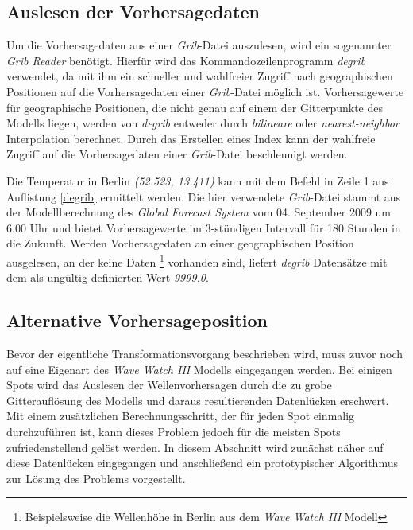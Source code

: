 \subsection{Auslesen der Vorhersagedaten}
\label{auslesen-der-vorhersagedaten}
Um die Vorhersagedaten aus einer \textit{Grib}-Datei auszulesen, wird
ein sogenannter \textit{Grib Reader} benötigt. Hierfür wird das
Kommandozeilenprogramm \textit{degrib} verwendet, da mit ihm ein
schneller und wahlfreier Zugriff nach geographischen Positionen auf
die Vorhersagedaten einer \textit{Grib}-Datei möglich
ist. Vorhersagewerte für geographische Positionen, die nicht genau auf
einem der Gitterpunkte des Modells liegen, werden von \textit{degrib}
entweder durch \textit{bilineare} oder \textit{nearest-neighbor}
Interpolation berechnet. Durch das Erstellen eines Index kann der
wahlfreie Zugriff auf die Vorhersagedaten einer \textit{Grib}-Datei
beschleunigt werden.



Die Temperatur in Berlin \textit{(52.523, 13.411)} kann mit dem Befehl
in Zeile 1 aus Auflistung \ref{degrib} ermittelt werden. Die hier
verwendete \textit{Grib}-Datei stammt aus der Modellberechnung des
\textit{Global Forecast System} vom 04. September 2009 um 6.00 Uhr und
bietet Vorhersagewerte im 3-stündigen Intervall für 180 Stunden in die
Zukunft. Werden Vorhersagedaten an einer geographischen Position
ausgelesen, an der keine Daten \footnote{Beispielsweise die Wellenhöhe
  in Berlin aus dem \textit{Wave Watch III} Modell} vorhanden sind,
liefert \textit{degrib} Datensätze mit dem als ungültig definierten
Wert \textit{9999.0}.

\subsection{Alternative Vorhersageposition}
Bevor der eigentliche Transformationsvorgang beschrieben wird, muss
zuvor noch auf eine Eigenart des \textit{Wave Watch III} Modells
eingegangen werden. Bei einigen Spots wird das Auslesen der
Wellenvorhersagen durch die zu grobe Gitterauflösung des Modells und
daraus resultierenden Datenlücken erschwert. Mit einem zusätzlichen
Berechnungsschritt, der für jeden Spot einmalig durchzuführen ist,
kann dieses Problem jedoch für die meisten Spots zufriedenstellend
gelöst werden. In diesem Abschnitt wird zunächst näher auf diese
Datenlücken eingegangen und anschließend ein prototypischer
Algorithmus zur Lösung des Problems vorgestellt.

